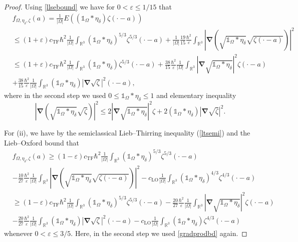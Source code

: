 \documentclass[final,onefignum,onetabnum,reqno]{amsart}
\theoremstyle{remark}
\renewcommand{\le}{\leqslant}
\renewcommand{\ge}{\geqslant}
\renewcommand{\epsilon}{\varepsilon}
\newcommand{\RR}{\mathbb{R}}
\newcommand{\TF}{\mathrm{TF}} %
\newcommand{\LO}{\mathrm{LO}} %
\newcommand{\iden}{\mathbb{1}} %
\newcommand{\grad}{\bm{\nabla}} %
\begin{document}
\begin{proof}
Using \cref{llsebound} we have for $0<\epsilon\le 1/15$ that
\begin{align*}
&f_{\Omega,\eta_\delta,\zeta}(a)=\frac{1}{|\Omega|} E((\iden_{\Omega}*\eta_\delta)\zeta(\cdot-a))\\
&\le (1+\epsilon) c_{\TF}\hbar^2 \frac{1}{|\Omega|} \int_{\RR^3} (\iden_{\Omega}*\eta_\delta)^{5/3}\zeta^{5/3}(\cdot-a) + \frac{1}{|\Omega|} \frac{19}{15} \frac{\hbar^2}{\epsilon} \int_{\RR^3} |\grad (\sqrt{\iden_{\Omega}*\eta_\delta}\sqrt{\zeta(\cdot-a)})|^2\\
&\le (1+\epsilon) c_{\TF}\hbar^2  \frac{1}{|\Omega|} \int_{\RR^3} (\iden_{\Omega}*\eta_\delta)\zeta^{5/3}(\cdot-a) + \frac{38}{15}\frac{\hbar^2}{\epsilon} \frac{1}{|\Omega|} \int_{\RR^3} |\grad \sqrt{\iden_{\Omega}*\eta_\delta}|^2\zeta(\cdot-a) \\
&+ \frac{38}{15}\frac{\hbar^2}{\epsilon} \frac{1}{|\Omega|} \int_{\RR^3} (\iden_{\Omega}*\eta_\delta)|\grad \sqrt{\zeta}|^2(\cdot-a),
\end{align*}
where in the second step we used $0\le \iden_{\Omega}*\eta_\delta\le 1$ and elementary inequality
\begin{equation}\label{gradprodbd}
|\grad (\sqrt{\iden_{\Omega}*\eta_\delta}\sqrt{\zeta})|^2\le 2|\grad\sqrt{\iden_{\Omega}*\eta_\delta}|^2 \zeta + 2(\iden_{\Omega}*\eta_\delta)|\grad\sqrt{\zeta}|^2.
\end{equation}

For (ii), we have by the semiclassical Lieb--Thirring inequality (\cref{ltsemi}) and the Lieb--Oxford bound that
\begin{align*}
&f_{\Omega,\eta_\delta,\zeta}(a)\ge (1-\epsilon)c_\TF\hbar^2 \frac{1}{|\Omega|}\int_{\RR^3} (\iden_{\Omega}*\eta_\delta)^{5/3}\zeta^{5/3}(\cdot-a)\\
&- \frac{10}{27}\frac{\hbar^2}{\epsilon}\frac{1}{|\Omega|}\int_{\RR^3}|\grad (\sqrt{\iden_{\Omega}*\eta_\delta}\sqrt{\zeta(\cdot-a)})|^2
-c_\LO \frac{1}{|\Omega|}\int_{\RR^3} (\iden_{\Omega}*\eta_\delta)^{4/3}\zeta^{4/3}(\cdot-a)\\
&\ge (1-\epsilon)c_\TF\hbar^2 \frac{1}{|\Omega|}\int_{\RR^3} (\iden_{\Omega}*\eta_\delta)^{5/3}\zeta^{5/3}(\cdot-a) - \frac{20}{27}\frac{\hbar^2}{\epsilon}\frac{1}{|\Omega|}\int_{\RR^3}|\grad \sqrt{\iden_{\Omega}*\eta_\delta}|^2\zeta(\cdot-a)\\
&- \frac{20}{27}\frac{\hbar^2}{\epsilon}\frac{1}{|\Omega|}\int_{\RR^3}(\iden_{\Omega}*\eta_\delta)|\grad \sqrt{\zeta}|^2(\cdot-a)-c_\LO \frac{1}{|\Omega|}\int_{\RR^3} (\iden_{\Omega}*\eta_\delta)\zeta^{4/3}(\cdot-a)
\end{align*}
whenever $0<\epsilon\le 3/5$.
Here, in the second step we used \cref{gradprodbd} again.
\end{proof}
\end{document}

